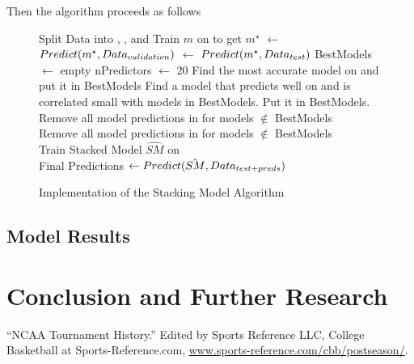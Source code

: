 \documentclass[10pt,a4paper, hidelinks]{article} %
\begin{document}
Then the algorithm proceeds as follows
\begin{figure}[H]
	\centering
	\begin{tcolorbox}
		\begin{algorithmic}
			\State Split Data into \dattrain, \datval, and \dattest
			\State Train $m$ on \dattrain to get $m^{\star}$
			\State \datvaltest $\leftarrow$ $Predict(m^{\star},Data_{validation})$
			\State \dattestpreds $\leftarrow$ $Predict(m^{\star},Data_{test})$
			\EndFor
			\State BestModels $\leftarrow $ empty
			\State nPredictors $\leftarrow$ 20
			\State Find the most accurate model on \datval and \State put it in BestModels
			\Else 
			\State Find a model that predicts well  on \datval \State and is correlated small with models in BestModels.  \State Put it in BestModels.
			\EndIf
			\EndFor
			\State Remove all model predictions in \datvaltest for models $\notin$ BestModels\\
			\State Remove all model predictions in \dattestpreds for models $\notin$ BestModels\\
			\State Train Stacked Model $\hat{SM}$ on \datvaltest\\
			\State Final Predictions $\leftarrow Predict(\hat{SM}, Data_{test + preds}) $
		\end{algorithmic}
	\end{tcolorbox}
\caption{Implementation of the Stacking Model Algorithm}
\end{figure}




\subsection{Model Results}

\section{Conclusion and Further Research}

\newpage
\begin{thebibliography}{9}
	
	“NCAA Tournament History.” Edited by Sports Reference LLC, College Basketball at Sports-Reference.com, {\color{blue} \url{www.sports-reference.com/cbb/postseason/}}.
	
\end{thebibliography}
\end{document}

